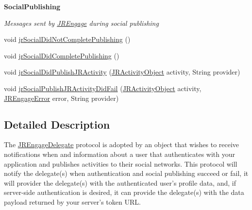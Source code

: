 \begin{Indent}{\bf SocialPublishing}\par
{\em \label{_amgrpeb046f03f7c48654b2974e7c81bd7f9b}
 Messages sent by \hyperlink{classcom_1_1janrain_1_1android_1_1engage_1_1_j_r_engage}{JREngage} during social publishing }\begin{DoxyCompactItemize}
\item 
void \hyperlink{interfacecom_1_1janrain_1_1android_1_1engage_1_1_j_r_engage_delegate_a1828e05762a1cc87d338dd51e60822be}{jrSocialDidNotCompletePublishing} ()
\item 
void \hyperlink{interfacecom_1_1janrain_1_1android_1_1engage_1_1_j_r_engage_delegate_abe261e58875824c6f9cf817a02db6614}{jrSocialDidCompletePublishing} ()
\item 
void \hyperlink{interfacecom_1_1janrain_1_1android_1_1engage_1_1_j_r_engage_delegate_a02961743a0f611a582df40310e4bd06e}{jrSocialDidPublishJRActivity} (\hyperlink{classcom_1_1janrain_1_1android_1_1engage_1_1types_1_1_j_r_activity_object}{JRActivityObject} activity, String provider)
\item 
void \hyperlink{interfacecom_1_1janrain_1_1android_1_1engage_1_1_j_r_engage_delegate_ad507d7e12581d5e779241035e07fe659}{jrSocialPublishJRActivityDidFail} (\hyperlink{classcom_1_1janrain_1_1android_1_1engage_1_1types_1_1_j_r_activity_object}{JRActivityObject} activity, \hyperlink{classcom_1_1janrain_1_1android_1_1engage_1_1_j_r_engage_error}{JREngageError} error, String provider)
\end{DoxyCompactItemize}
\end{Indent}


\subsection{Detailed Description}
The \hyperlink{interfacecom_1_1janrain_1_1android_1_1engage_1_1_j_r_engage_delegate}{JREngageDelegate} protocol is adopted by an object that wishes to receive notifications when and information about a user that authenticates with your application and publishes activities to their social networks. This protocol will notify the delegate(s) when authentication and social publishing succeed or fail, it will provider the delegate(s) with the authenticated user's profile data, and, if server-\/side authentication is desired, it can provide the delegate(s) with the data payload returned by your server's token URL. 

